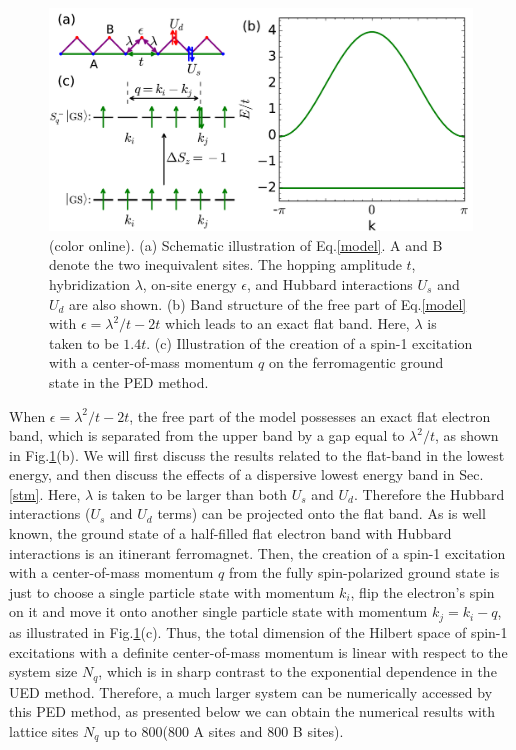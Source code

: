 \documentclass[amsmath,superscriptaddress,showpacs,aps,prb,twocolumn]{revtex4-1}
\begin{document}
\begin{figure}
\includegraphics[scale=0.4]{lattice}
\caption{(color online). (a) Schematic illustration of Eq.\ref{model}. A and B denote the two inequivalent sites. The hopping amplitude $t$, hybridization $\lambda$, on-site energy $\epsilon$, and Hubbard interactions $U_s$ and $U_d$ are also shown. (b) Band structure of the free part of Eq.\ref{model} with $\epsilon=\lambda^2/t-2t$ which leads to an exact flat band. Here, $\lambda$ is taken to be $1.4t$. (c) Illustration of the creation of a spin-1 excitation with a center-of-mass momentum $q$ on the ferromagentic ground state in the PED method.}
\label{lattice}
\end{figure}

\par When $\epsilon=\lambda^2/t-2t$, the free part of the model possesses an exact flat electron band, which is separated from the upper band by a gap equal to $\lambda^2/t$, as shown in Fig.\ref{lattice}(b). We will first discuss the results related to the flat-band in the lowest energy, and then discuss the effects of a dispersive lowest energy band in Sec.\ref{stm}. Here, $\lambda$ is taken to be larger than both $U_s$ and $U_d$. Therefore the Hubbard interactions ($U_s$ and $U_d$ terms) can be projected onto the flat band. As is well known, the ground state of a half-filled flat electron band with Hubbard interactions is an itinerant ferromagnet. Then, the creation of a spin-1 excitation with a center-of-mass momentum $q$ from the fully spin-polarized ground state is just to choose a single particle state with momentum $k_i$, flip the electron's spin on it and move it onto another single particle state with momentum $k_j=k_i-q$, as illustrated in Fig.\ref{lattice}(c). Thus, the total dimension of the Hilbert space of spin-1 excitations with a definite center-of-mass momentum is linear with respect to the system size $N_q$, which is in sharp contrast to the exponential dependence in the UED method. Therefore, a much larger system can be numerically accessed by this PED method, as presented below we can obtain the numerical results with lattice sites $N_q$ up to $800$(800 A sites and 800 B sites).
\end{document}
